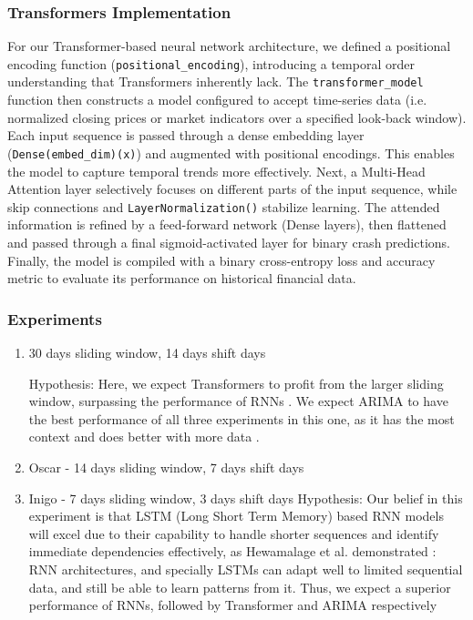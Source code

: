 \documentclass[12pt, letterpaper]{article}
\begin{document}
\subsubsection*{Transformers Implementation}
For our Transformer-based neural network architecture, we defined a positional encoding function (\texttt{positional\_encoding}), introducing a temporal order understanding that Transformers inherently lack. The \texttt{transformer\_model} function then constructs a model configured to accept time-series data (i.e. normalized closing prices or market indicators over a specified look-back window). Each input sequence is passed through a dense embedding layer (\texttt{Dense(embed\_dim)(x)}) and augmented with positional encodings. This enables the model to capture temporal trends more effectively. Next, a Multi-Head Attention layer selectively focuses on different parts of the input sequence, while skip connections and \texttt{LayerNormalization()} stabilize learning. The attended information is refined by a feed-forward network (Dense layers), then flattened and passed through a final sigmoid-activated layer for binary crash predictions. Finally, the model is compiled with a binary cross-entropy loss and accuracy metric to evaluate its performance on historical financial data.

\subsubsection*{Experiments}
    \begin{enumerate}
        \item 30 days sliding window, 14 days shift days
            
            Hypothesis: Here, we expect Transformers to profit from the larger sliding window, surpassing the performance of RNNs \cite{greff2017, sp500arimalstmregression}. We expect ARIMA to have the best performance of all three experiments in this one, as it has the most context and does better with more data \cite{ho2021}.
        \item Oscar - 14 days sliding window, 7 days shift days
        \item Inigo - 7 days sliding window, 3 days shift days
            Hypothesis: Our belief in this experiment is that LSTM (Long Short Term Memory) based RNN models will excel due to their capability to handle shorter sequences and identify immediate dependencies effectively, as Hewamalage et al. demonstrated \cite{Hansika}: RNN architectures, and specially LSTMs can adapt well to limited sequential data, and still be able to learn patterns from it. Thus, we expect a superior performance of RNNs, followed by Transformer and ARIMA respectively
    \end{enumerate}
\end{document}
